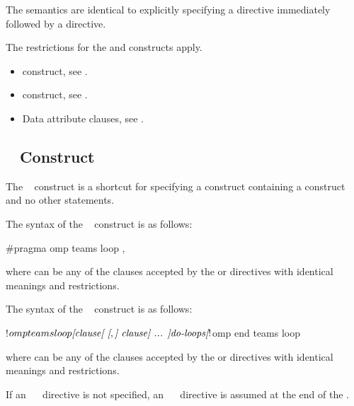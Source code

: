 \descr
The semantics are identical to explicitly specifying a  directive immediately
followed by a  directive.


\restrictions
The restrictions for the  and  constructs apply.

\crossreferences
\begin{itemize}
\item {} construct, see
.

\item {} construct, see
.

\item Data attribute clauses, see
.
\end{itemize}




\subsection{~ Construct}
\label{subsec:teams loop Construct}
\summary
The ~ construct is a shortcut for specifying a  construct
containing a  construct and no other statements.

\syntax
\begin{ccppspecific}
The syntax of the ~ construct is as follows:

\begin{ompcPragma}
#pragma omp teams loop \plc{[clause[ [},\plc{] clause] ... ] new-line}
\end{ompcPragma}

where  can be any of the clauses accepted by the  or
   directives with identical meanings and restrictions.
\end{ccppspecific}

\begin{fortranspecific}
The syntax of the ~ construct is as follows:

\begin{ompfPragma}
!$omp teams loop \plc{[clause[ [},\plc{] clause] ... ]}
    \plc{do-loops}
\plc{[}!$omp end teams loop\plc{]}
\end{ompfPragma}

where  can be any of the clauses accepted by the  or
directives with identical meanings and restrictions.

If an ~~ directive is not specified, an
~~ directive is assumed at the end of the .
\end{fortranspecific}

